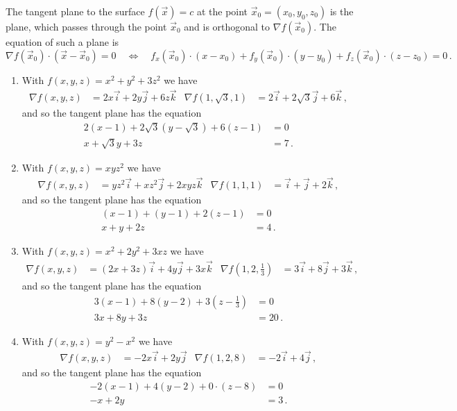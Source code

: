 \begin{solution}
The tangent plane to the surface $f(\vec x)=c$ at the point $\vec x_0 = (x_0,y_0,z_0)$ is the plane, which passes through the point $\vec x_0$ and is orthogonal to $\nabla f(\vec x_0)$. The equation of such a plane is
\[
\nabla f(\vec x_0) \cdot (\vec x - \vec x_0) = 0
\quad\Leftrightarrow\quad
f_x(\vec x_0)\cdot(x-x_0) + f_y(\vec x_0)\cdot(y-y_0) + f_z(\vec x_0)\cdot(z-z_0) = 0\,.
\]

\begin{enumerate}
\item
With $f(x,y,z) = x^2+y^2+3z^2$ we have
\begin{align*}
\nabla f(x,y,z) &= 2x \vec i + 2y \vec j + 6z \vec k &
\nabla f\left(1, \sqrt 3, 1 \right) &= 2\vec i + 2\sqrt{3} \vec j + 6 \vec k \,,
\end{align*}
and so the tangent plane has the equation
\begin{align*}
2(x-1) + 2\sqrt{3}(y-\sqrt{3}) + 6(z-1) &= 0 \\
x + \sqrt{3} y + 3z &= 7\,.
\end{align*}

\item
With $f(x,y,z) = xyz^2$ we have
\begin{align*}
\nabla f(x,y,z) &= yz^2 \vec i + xz^2 \vec j + 2xyz \vec k &
\nabla f\left(1, 1, 1 \right) &= \vec i + \vec j + 2 \vec k \,,
\end{align*}
and so the tangent plane has the equation
\begin{align*}
(x-1) + (y-1) + 2(z-1) &= 0 \\
x + y + 2z &= 4\,.
\end{align*}

\item
With $f(x,y,z) = x^2+2y^2+3xz$ we have
\begin{align*}
\nabla f(x,y,z) &= (2x + 3z) \vec i + 4y \vec j + 3x \vec k &
\nabla f\left(1, 2, \frac 13 \right) &= 3\vec i + 8\vec j + 3 \vec k \,,
\end{align*}
and so the tangent plane has the equation
\begin{align*}
3(x-1) + 8(y-2) + 3\left(z-\frac 13\right) &= 0 \\
3x + 8 y + 3z &= 20\,.
\end{align*}

\item
With $f(x,y,z) = y^2 - x^2$ we have
\begin{align*}
\nabla f(x,y,z) &= -2x \vec i + 2y \vec j &
\nabla f\left(1, 2, 8\right) &= -2\vec i + 4\vec j\,,
\end{align*}
and so the tangent plane has the equation
\begin{align*}
-2(x-1) + 4(y-2) + 0\cdot \left(z-8\right) &= 0 \\
-x + 2y &= 3\,.
\end{align*}
\end{enumerate}
\end{solution}

